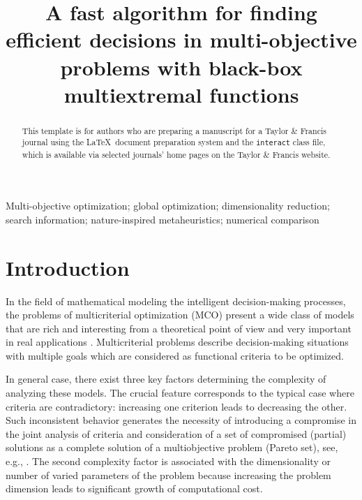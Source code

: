 \documentclass[]{interact}
\theoremstyle{plain}%
\theoremstyle{definition}
\theoremstyle{remark}
\begin{document}

\title{A fast algorithm for finding efficient decisions in multi-objective problems with black-box multiextremal functions}

\author{
}

\maketitle

\begin{abstract}
This template is for authors who are preparing a manuscript for a Taylor \& Francis journal using the \LaTeX\ document preparation system and the \texttt{interact} class file, which is available via selected journals' home pages on the Taylor \& Francis website.
\end{abstract}

\begin{keywords}
Multi-objective optimization; global optimization; dimensionality reduction; search information; nature-inspired metaheuristics; numerical comparison
\end{keywords}


\section{Introduction}

In the field of mathematical modeling the intelligent decision-making processes, the problems of multicriterial optimization (MCO) present a wide class of models that are rich and interesting from a theoretical point of view and very important in real applications \cite{Marler2009,Hillermeier2005}. Multicriterial problems describe decision-making situations with multiple goals which are considered as functional criteria to be optimized.

In general case, there exist three key factors determining the complexity of analyzing these models. The crucial feature corresponds to the typical case where criteria are contradictory: increasing one criterion leads to decreasing the other. Such inconsistent behavior generates the necessity of introducing a compromise in the joint analysis of criteria and consideration of a set of compromised (partial) solutions as a complete solution of a multiobjective problem (Pareto set), see, e.g., \cite{Collette2004,Ehrgott2005}.
The second complexity factor is associated with the dimensionality or number of varied parameters of the problem because increasing the problem dimension leads to significant growth of computational cost. 
\end{document}
